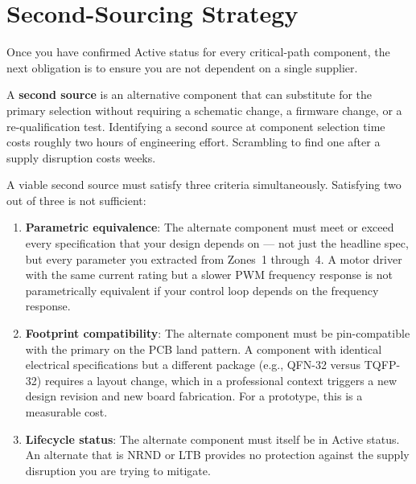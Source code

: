 \section{Second-Sourcing Strategy}
\label{sec:ch6-secondsource}

Once you have confirmed Active status for every critical-path component, the next obligation is to ensure you are not dependent on a single supplier.

A \textbf{second source} is an alternative component that can substitute for the primary selection without requiring a schematic change, a firmware change, or a re-qualification test.
Identifying a second source at component selection time costs roughly two hours of engineering effort.
Scrambling to find one after a supply disruption costs weeks.

A viable second source must satisfy three criteria simultaneously.
Satisfying two out of three is not sufficient:

\begin{enumerate}
  \item \textbf{Parametric equivalence}: The alternate component must meet or exceed every specification that your design depends on --- not just the headline spec, but every parameter you extracted from Zones~1 through~4.
        A motor driver with the same current rating but a slower PWM frequency response is not parametrically equivalent if your control loop depends on the frequency response.

  \item \textbf{Footprint compatibility}: The alternate component must be pin-compatible with the primary on the PCB land pattern.
        A component with identical electrical specifications but a different package (e.g., QFN-32 versus TQFP-32) requires a layout change, which in a professional context triggers a new design revision and new board fabrication.
        For a prototype, this is a measurable cost.

  \item \textbf{Lifecycle status}: The alternate component must itself be in Active status.
        An alternate that is NRND or LTB provides no protection against the supply disruption you are trying to mitigate.
\end{enumerate}

